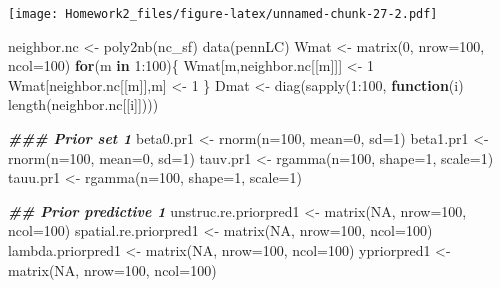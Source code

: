\documentclass[
]{article}
\newenvironment{Shaded}{\begin{snugshade}}{\end{snugshade}}
\newcommand{\AttributeTok}[1]{\textcolor[rgb]{0.77,0.63,0.00}{#1}}
\newcommand{\ConstantTok}[1]{\textcolor[rgb]{0.00,0.00,0.00}{#1}}
\newcommand{\ControlFlowTok}[1]{\textcolor[rgb]{0.13,0.29,0.53}{\textbf{#1}}}
\newcommand{\DecValTok}[1]{\textcolor[rgb]{0.00,0.00,0.81}{#1}}
\newcommand{\DocumentationTok}[1]{\textcolor[rgb]{0.56,0.35,0.01}{\textbf{\textit{#1}}}}
\newcommand{\FunctionTok}[1]{\textcolor[rgb]{0.00,0.00,0.00}{#1}}
\newcommand{\NormalTok}[1]{#1}
\newcommand{\OtherTok}[1]{\textcolor[rgb]{0.56,0.35,0.01}{#1}}
\newcommand{\SpecialCharTok}[1]{\textcolor[rgb]{0.00,0.00,0.00}{#1}}
\begin{document}
\texttt{[image: Homework2\_files/figure-latex/unnamed-chunk-27-2.pdf]}

\begin{Shaded}
\begin{Highlighting}[]
\NormalTok{neighbor.nc }\OtherTok{\textless{}{-}} \FunctionTok{poly2nb}\NormalTok{(nc\_sf)}
\FunctionTok{data}\NormalTok{(pennLC)}
\NormalTok{Wmat }\OtherTok{\textless{}{-}} \FunctionTok{matrix}\NormalTok{(}\DecValTok{0}\NormalTok{, }\AttributeTok{nrow=}\DecValTok{100}\NormalTok{, }\AttributeTok{ncol=}\DecValTok{100}\NormalTok{)}
\ControlFlowTok{for}\NormalTok{(m }\ControlFlowTok{in} \DecValTok{1}\SpecialCharTok{:}\DecValTok{100}\NormalTok{)\{}
\NormalTok{  Wmat[m,neighbor.nc[[m]]] }\OtherTok{\textless{}{-}} \DecValTok{1}
\NormalTok{  Wmat[neighbor.nc[[m]],m] }\OtherTok{\textless{}{-}} \DecValTok{1}
\NormalTok{\}  }
\NormalTok{Dmat }\OtherTok{\textless{}{-}} \FunctionTok{diag}\NormalTok{(}\FunctionTok{sapply}\NormalTok{(}\DecValTok{1}\SpecialCharTok{:}\DecValTok{100}\NormalTok{, }\ControlFlowTok{function}\NormalTok{(i) }\FunctionTok{length}\NormalTok{(neighbor.nc[[i]])))}

\DocumentationTok{\#\#\# Prior set 1}
\NormalTok{beta0.pr1 }\OtherTok{\textless{}{-}} \FunctionTok{rnorm}\NormalTok{(}\AttributeTok{n=}\DecValTok{100}\NormalTok{, }\AttributeTok{mean=}\DecValTok{0}\NormalTok{, }\AttributeTok{sd=}\DecValTok{1}\NormalTok{)}
\NormalTok{beta1.pr1 }\OtherTok{\textless{}{-}} \FunctionTok{rnorm}\NormalTok{(}\AttributeTok{n=}\DecValTok{100}\NormalTok{, }\AttributeTok{mean=}\DecValTok{0}\NormalTok{, }\AttributeTok{sd=}\DecValTok{1}\NormalTok{)}
\NormalTok{tauv.pr1 }\OtherTok{\textless{}{-}} \FunctionTok{rgamma}\NormalTok{(}\AttributeTok{n=}\DecValTok{100}\NormalTok{, }\AttributeTok{shape=}\DecValTok{1}\NormalTok{, }\AttributeTok{scale=}\DecValTok{1}\NormalTok{)}
\NormalTok{tauu.pr1 }\OtherTok{\textless{}{-}} \FunctionTok{rgamma}\NormalTok{(}\AttributeTok{n=}\DecValTok{100}\NormalTok{, }\AttributeTok{shape=}\DecValTok{1}\NormalTok{, }\AttributeTok{scale=}\DecValTok{1}\NormalTok{)}


\DocumentationTok{\#\# Prior predictive 1}
\NormalTok{unstruc.re.priorpred1 }\OtherTok{\textless{}{-}} \FunctionTok{matrix}\NormalTok{(}\ConstantTok{NA}\NormalTok{, }\AttributeTok{nrow=}\DecValTok{100}\NormalTok{, }\AttributeTok{ncol=}\DecValTok{100}\NormalTok{)}
\NormalTok{spatial.re.priorpred1 }\OtherTok{\textless{}{-}} \FunctionTok{matrix}\NormalTok{(}\ConstantTok{NA}\NormalTok{, }\AttributeTok{nrow=}\DecValTok{100}\NormalTok{, }\AttributeTok{ncol=}\DecValTok{100}\NormalTok{)}
\NormalTok{lambda.priorpred1 }\OtherTok{\textless{}{-}} \FunctionTok{matrix}\NormalTok{(}\ConstantTok{NA}\NormalTok{, }\AttributeTok{nrow=}\DecValTok{100}\NormalTok{, }\AttributeTok{ncol=}\DecValTok{100}\NormalTok{)}
\NormalTok{ypriorpred1 }\OtherTok{\textless{}{-}} \FunctionTok{matrix}\NormalTok{(}\ConstantTok{NA}\NormalTok{, }\AttributeTok{nrow=}\DecValTok{100}\NormalTok{, }\AttributeTok{ncol=}\DecValTok{100}\NormalTok{)}


\end{Highlighting}
\end{Shaded}
\end{document}
